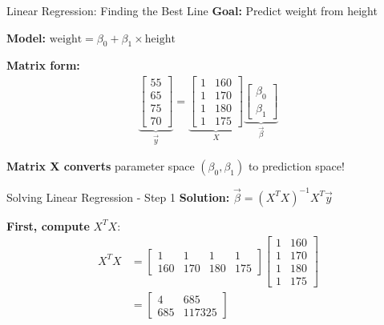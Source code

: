 \documentclass[aspectratio=169]{beamer}
\begin{document}
\begin{frame}{Linear Regression: Finding the Best Line}
\textbf{Goal:} Predict weight from height

\vspace{1em}
\textbf{Model:} $\text{weight} = \beta_0 + \beta_1 \times \text{height}$

\vspace{1em}
\textbf{Matrix form:}
\begin{align}
\underbrace{\begin{bmatrix} 55 \\ 65 \\ 75 \\ 70 \end{bmatrix}}_{\vec{y}} = 
\underbrace{\begin{bmatrix} 1 & 160 \\ 1 & 170 \\ 1 & 180 \\ 1 & 175 \end{bmatrix}}_{X} 
\underbrace{\begin{bmatrix} \beta_0 \\ \beta_1 \end{bmatrix}}_{\vec{\beta}}
\end{align}

\textbf{Matrix X converts} parameter space $(\beta_0, \beta_1)$ to prediction space!
\end{frame}

\begin{frame}{Solving Linear Regression - Step 1}
\textbf{Solution:} $\vec{\beta} = (X^T X)^{-1} X^T \vec{y}$

\vspace{1em}
\textbf{First, compute } $X^T X$:
\begin{align}
X^T X &= \begin{bmatrix} 1 & 1 & 1 & 1 \\ 160 & 170 & 180 & 175 \end{bmatrix} \begin{bmatrix} 1 & 160 \\ 1 & 170 \\ 1 & 180 \\ 1 & 175 \end{bmatrix} \\
&= \begin{bmatrix} 4 & 685 \\ 685 & 117325 \end{bmatrix}
\end{align}
\end{frame}
\end{document}
